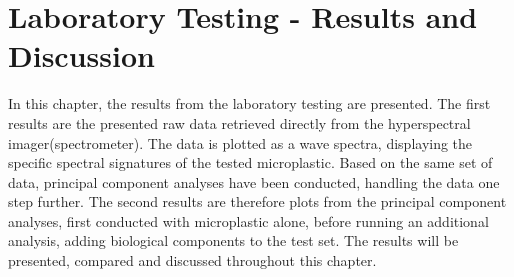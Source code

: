 \chapter{Laboratory Testing - Results and Discussion}
\label{chap:results}

In this chapter, the results from the laboratory testing are presented. The first results are the presented raw data retrieved directly from the hyperspectral imager(spectrometer). The data is plotted as a wave spectra, displaying the specific spectral signatures of the tested microplastic. Based on the same set of data, principal component analyses have been conducted, handling the data one step further. The second results are therefore plots from the principal component analyses, first conducted with microplastic alone, before running an additional analysis, adding biological components to the test set. The results will be presented, compared and discussed throughout this chapter. 

